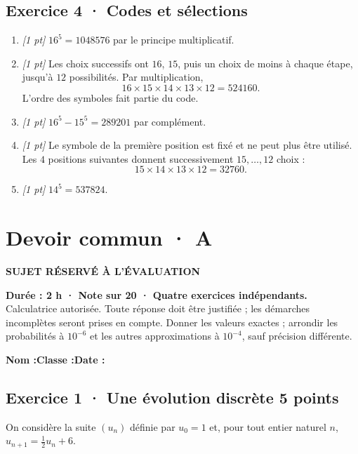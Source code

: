 \subsection*{Exercice 4 · Codes et sélections}\begin{enumerate}

\item \textit{[1 pt]} $16^5=1048576$ par le principe multiplicatif.

\item \textit{[1 pt]} Les choix successifs ont $16$, $15$, puis un choix de moins à chaque étape, jusqu'à $12$ possibilités. Par multiplication,
\[16\times15\times14\times13\times12=524160.\]
L'ordre des symboles fait partie du code.

\item \textit{[1 pt]} $16^5-15^5=289201$ par complément.

\item \textit{[1 pt]} Le symbole de la première position est fixé et ne peut plus être utilisé. Les $4$ positions suivantes donnent successivement $15,\ldots,12$ choix :
\[15\times14\times13\times12=32760.\]

\item \textit{[1 pt]} $14^5=537824$.

\end{enumerate}

\fi

\ifmxteacher

\mxnewpage{}\label{sujet:3-3}

\section*{Devoir commun · A}

{\sffamily\bfseries\color{mxwarn}SUJET RÉSERVÉ À L'ÉVALUATION\par}

\textbf{Durée : 2 h · Note sur 20 · Quatre exercices indépendants.}\\Calculatrice autorisée. Toute réponse doit être justifiée ; les démarches incomplètes seront prises en compte. Donner les valeurs exactes ; arrondir les probabilités à $10^{-6}$ et les autres approximations à $10^{-4}$, sauf précision différente.

\smallskip\textbf{Nom :}\enspace\dotfill\quad\textbf{Classe :}\enspace\dotfill\quad\textbf{Date :}\enspace\dotfill

\subsection*{Exercice 1 · Une évolution discrète \hfill 5 points}On considère la suite $(u_n)$ définie par $u_0=1$ et, pour tout entier naturel $n$, $u_{n+1}=\frac{1}{2}u_n+6$.

